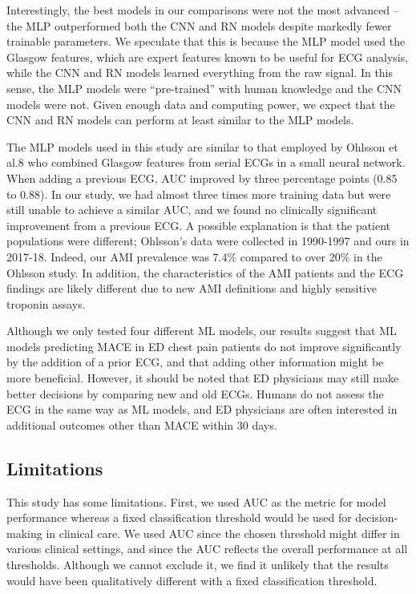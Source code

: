 \documentclass[preprint]{elsarticle}
\begin{document}
Interestingly, the best models in our comparisons were not the most advanced – the MLP outperformed both the CNN and RN models despite markedly fewer trainable parameters. We speculate that this is because the MLP model used the Glasgow features, which are expert features known to be useful for ECG analysis, while the CNN and RN models learned everything from the raw signal. In this sense, the MLP models were “pre-trained” with human knowledge and the CNN models were not. Given enough data and computing power, we expect that the CNN and RN models can perform at least similar to the MLP models.

The MLP models used in this study are similar to that employed by Ohlsson et al.8 who combined Glasgow features from serial ECGs in a small neural network. When adding a previous ECG, AUC improved by three percentage points (0.85 to 0.88). In our study, we had almost three times more training data but were still unable to achieve a similar AUC, and we found no clinically significant improvement from a previous ECG. A possible explanation is that the patient populations were different; Ohlsson’s data were collected in 1990-1997 and ours in 2017-18. Indeed, our AMI prevalence was 7.4\% compared to over 20\% in the Ohlsson study. In addition, the characteristics of the AMI patients and the ECG findings are likely different due to new AMI definitions and highly sensitive troponin assays. 

Although we only tested four different ML models, our results suggest that ML models predicting MACE in ED chest pain patients do not improve significantly by the addition of a prior ECG, and that adding other information might be more beneficial. However, it should be noted that ED physicians may still make better decisions by comparing new and old ECGs. Humans do not assess the ECG in the same way as ML models, and ED physicians are often interested in additional outcomes other than MACE within 30 days.

\subsection{Limitations}
This study has some limitations. First, we used AUC as the metric for model performance whereas a fixed classification threshold would be used for decision-making in clinical care. We used AUC since the chosen threshold might differ in various clinical settings, and since the AUC reflects the overall performance at all thresholds. Although we cannot exclude it, we find it unlikely that the results would have been qualitatively different with a fixed classification threshold.
\end{document}
